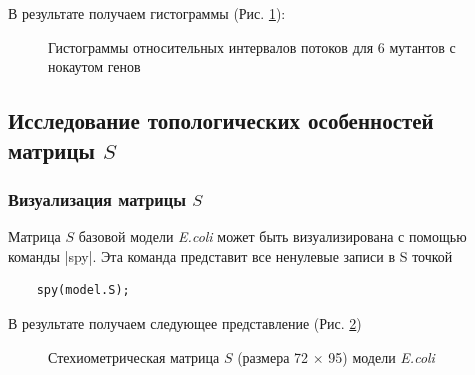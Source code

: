 \documentclass[a4paper, 12pt]{article}
\begin{document}
В результате получаем гистограммы (Рис. \ref{fig:n_e}):
\begin{figure}[H]
    \caption{Гистограммы относительных интервалов потоков для 6 мутантов с нокаутом генов}
    \label{fig:n_e}
\end{figure}

\subsection{Исследование топологических особенностей матрицы $S$}

\subsubsection{Визуализация матрицы $S$}

Матрица $S$ базовой модели \textit{E.coli} может быть визуализирована с помощью команды |spy|. Эта команда представит все ненулевые записи в S точкой
\begin{lstlisting}
    spy(model.S);
\end{lstlisting}

В результате получаем следующее представление (Рис. \ref{fig:S})
\begin{figure}[H]
    \caption{Стехиометрическая матрица $S$ (размера 72 $\times$ 95) модели \textit{E.coli}}
    \label{fig:S}
\end{figure}
\end{document}
